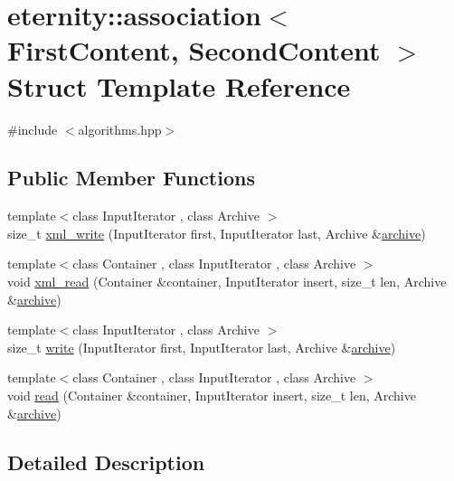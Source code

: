\hypertarget{structeternity_1_1association}{}\section{eternity\+:\+:association$<$ First\+Content, Second\+Content $>$ Struct Template Reference}
\label{structeternity_1_1association}


{\ttfamily \#include $<$algorithms.\+hpp$>$}

\subsection*{Public Member Functions}
\begin{DoxyCompactItemize}
\item 
{\footnotesize template$<$class Input\+Iterator , class Archive $>$ }\\size\+\_\+t \hyperlink{structeternity_1_1association_a826dce070ffd89015b66ea9ea26c07e2}{xml\+\_\+write} (Input\+Iterator first, Input\+Iterator last, Archive \&\hyperlink{classeternity_1_1archive}{archive})
\item 
{\footnotesize template$<$class Container , class Input\+Iterator , class Archive $>$ }\\void \hyperlink{structeternity_1_1association_a2f1c27b77cd84364c498feb134864d4f}{xml\+\_\+read} (Container \&container, Input\+Iterator insert, size\+\_\+t len, Archive \&\hyperlink{classeternity_1_1archive}{archive})
\item 
{\footnotesize template$<$class Input\+Iterator , class Archive $>$ }\\size\+\_\+t \hyperlink{structeternity_1_1association_a927d1de7c19bce31622b31417e107ebe}{write} (Input\+Iterator first, Input\+Iterator last, Archive \&\hyperlink{classeternity_1_1archive}{archive})
\item 
{\footnotesize template$<$class Container , class Input\+Iterator , class Archive $>$ }\\void \hyperlink{structeternity_1_1association_ab488701a51e5c139347c7c5acc88d05e}{read} (Container \&container, Input\+Iterator insert, size\+\_\+t len, Archive \&\hyperlink{classeternity_1_1archive}{archive})
\end{DoxyCompactItemize}


\subsection{Detailed Description}
